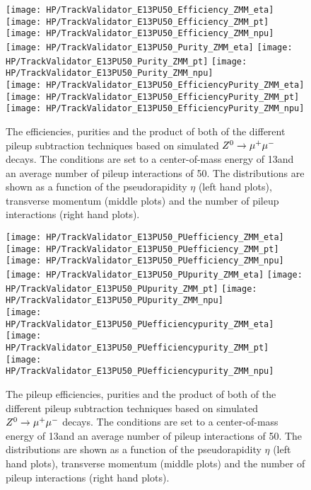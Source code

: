 \begin{figure}[!h]
  \centering
  \texttt{[image: HP/TrackValidator\_E13PU50\_Efficiency\_ZMM\_eta]}
  \texttt{[image: HP/TrackValidator\_E13PU50\_Efficiency\_ZMM\_pt]}
  \texttt{[image: HP/TrackValidator\_E13PU50\_Efficiency\_ZMM\_npu]}
   \\
  \texttt{[image: HP/TrackValidator\_E13PU50\_Purity\_ZMM\_eta]}
  \texttt{[image: HP/TrackValidator\_E13PU50\_Purity\_ZMM\_pt]}
  \texttt{[image: HP/TrackValidator\_E13PU50\_Purity\_ZMM\_npu]}
   \\
  \texttt{[image: HP/TrackValidator\_E13PU50\_EfficiencyPurity\_ZMM\_eta]}
  \texttt{[image: HP/TrackValidator\_E13PU50\_EfficiencyPurity\_ZMM\_pt]}
  \texttt{[image: HP/TrackValidator\_E13PU50\_EfficiencyPurity\_ZMM\_npu]}
  \caption[Efficiencies, purities and their product of the different pileup subtraction techniques based $\Zz\rightarrow\MM$ decays with 13\TeV and $\left<PU\right>=50$]{The efficiencies, purities and the product of both of the different pileup subtraction techniques based on simulated $\Zz\rightarrow\MM$ decays. The conditions are set to a center-of-mass energy of 13\TeV and an average number of pileup interactions of 50. The distributions are shown as a function of the pseudorapidity $\eta$ (left hand plots), transverse momentum (middle plots) and the number of pileup interactions (right hand plots).}
\end{figure}
\clearpage

\begin{figure}[!h]
  \centering
  \texttt{[image: HP/TrackValidator\_E13PU50\_PUefficiency\_ZMM\_eta]}
  \texttt{[image: HP/TrackValidator\_E13PU50\_PUefficiency\_ZMM\_pt]}
  \texttt{[image: HP/TrackValidator\_E13PU50\_PUefficiency\_ZMM\_npu]}
   \\
  \texttt{[image: HP/TrackValidator\_E13PU50\_PUpurity\_ZMM\_eta]}
  \texttt{[image: HP/TrackValidator\_E13PU50\_PUpurity\_ZMM\_pt]}
  \texttt{[image: HP/TrackValidator\_E13PU50\_PUpurity\_ZMM\_npu]}
   \\
  \texttt{[image: HP/TrackValidator\_E13PU50\_PUefficiencypurity\_ZMM\_eta]}
  \texttt{[image: HP/TrackValidator\_E13PU50\_PUefficiencypurity\_ZMM\_pt]}
  \texttt{[image: HP/TrackValidator\_E13PU50\_PUefficiencypurity\_ZMM\_npu]}
  \caption[Pileup efficiencies, purities and their product of the different pileup subtraction techniques based $\Zz\rightarrow\MM$ decays with 13\TeV and $\left<PU\right>=50$]{The pileup efficiencies, purities and the product of both of the different pileup subtraction techniques based on simulated $\Zz\rightarrow\MM$ decays. The conditions are set to a center-of-mass energy of 13\TeV and an average number of pileup interactions of 50. The distributions are shown as a function of the pseudorapidity $\eta$ (left hand plots), transverse momentum (middle plots) and the number of pileup interactions (right hand plots).}
\end{figure}
\clearpage


